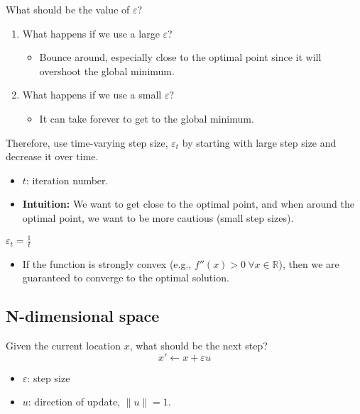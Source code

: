 \begin{intuition}
    What should be the value of \( \varepsilon \)?
        \begin{enumerate}
            \item What happens if we use a large \( \varepsilon \)?
            \begin{itemize}
                \item Bounce around, especially close to the optimal point since it will overshoot the global minimum.
            \end{itemize}
            
            \item What happens if we use a small \( \varepsilon \)?
            \begin{itemize}
                \item It can take forever to get to the global minimum.
            \end{itemize}
        \end{enumerate}  
        \vspace{1em}

    Therefore, use time-varying step size, \( \varepsilon_t \) by starting with large step size and decrease it over time.
    \begin{itemize}
        \item \( t \): iteration number.
        \item \textbf{Intuition:} We want to get close to the optimal point, and when around the optimal point, we want to be more cautious (small step sizes).
    \end{itemize}
\end{intuition}

\begin{example}
    \( \varepsilon_t = \frac{1}{t} \)
    \begin{itemize}
        \item If the function is strongly convex (e.g., \( f''(x) > 0 \ \forall x \in \mathbb{R} \)), then we are guaranteed to converge to the optimal solution.
    \end{itemize}
\end{example}

\subsection{N-dimensional space}
\begin{intuition}
    Given the current location \( x \), what should be the next step?
    \[
    x' \leftarrow x + \varepsilon u
    \]
    \begin{itemize}
        \item \( \varepsilon \): step size
        \item \( u \): direction of update, \( \|u\| = 1 \).
    \end{itemize}
\end{intuition}

